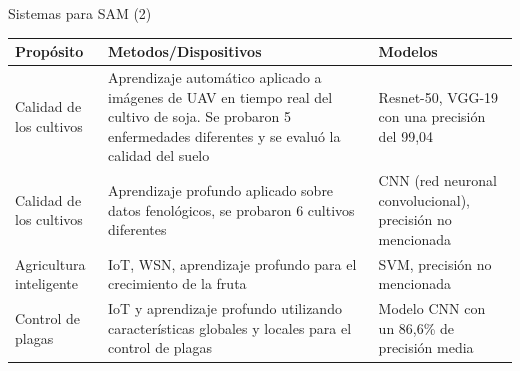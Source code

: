 \documentclass[aspectratio=169,compress]{beamer}
\begin{document}
\begin{frame}{Sistemas para SAM (2)}
\begin{center}
\footnotesize
\begin{tabular}{p{4.5cm}|p{4.5cm}|p{4.5cm}}
\hline
\textbf{Propósito} & \textbf{Metodos/Dispositivos} & \textbf{Modelos} \\
\hline

Calidad de los cultivos &
Aprendizaje automático aplicado a imágenes de UAV en tiempo real del cultivo de soja. Se probaron 5 enfermedades diferentes y se evaluó la calidad del suelo &
Resnet-50, VGG-19 con una precisión del 99,04 \\  \hline

Calidad de los cultivos &
Aprendizaje profundo aplicado sobre datos fenológicos, se probaron 6 cultivos diferentes &
CNN (red neuronal convolucional), precisión no mencionada \\  \hline

Agricultura inteligente &
IoT, WSN, aprendizaje profundo para el crecimiento de la fruta &
SVM, precisión no mencionada \\  \hline

Control de plagas &
IoT y aprendizaje profundo utilizando características globales y locales para el control de plagas &
Modelo CNN con un 86,6\% de precisión media \\  \hline




\end{tabular}
\end{center}

\end{frame}
\end{document}

